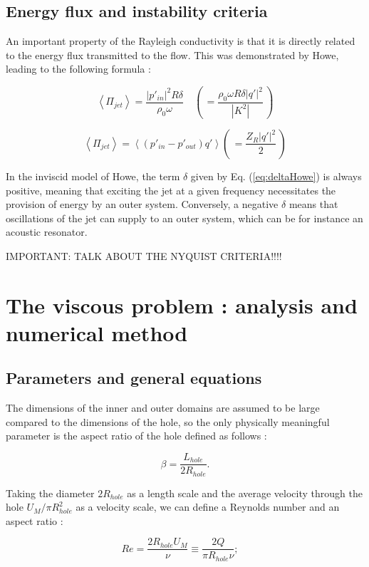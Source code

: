 \documentclass{jfm}
\newcommand\be{\begin{equation}}
\newcommand\ee{\end{equation}}
\begin{document}
\subsection{Energy flux and instability criteria}


An important property of the Rayleigh conductivity is that it is directly related to the energy flux transmitted to the flow. This was demonstrated by Howe, leading to the following formula :

\be
\left< \Pi_{jet} \right>  = \frac{ |p'_{in}|^2 R \delta}{\rho_0 \omega} 
\quad 
\left( \, = \frac{\rho_0 \omega R \delta | q' |^2 }{|K^2|} \, \right) 
\label{eq:Pienergy}
\ee

\be
\left< \Pi_{jet} \right>  = \left< (p'_{in}-p'_{out}) q'  \right> 
\left( \, = \frac{Z_R | q' |^2 }{2} \, \right) 
\label{eq:Pienergy}
\ee

In the inviscid model of Howe, the term $\delta$ given by Eq. (\ref{eq:deltaHowe}) is always positive, meaning that 
exciting the jet at a given frequency necessitates the provision of energy by an outer system. 
Conversely, a negative $\delta$ means that oscillations of the jet can supply to an outer system, which can be for instance an acoustic resonator. 

IMPORTANT: TALK ABOUT THE NYQUIST CRITERIA!!!!



\section{The viscous problem : analysis and numerical method}


\subsection{Parameters and general equations}



The dimensions of the inner and outer domains are assumed to be large compared to the dimensions of the hole, so the only physically meaningful parameter is the aspect ratio of the hole defined as follows : 

$$
\beta = \frac{ L_{hole}}{2 R_{hole}}.
$$

Taking the diameter $2 R_{hole} $ as a length scale and the average velocity through the hole  $U_M/\pi R_{hole}^2$  as a velocity scale, we can define a Reynolds number and an aspect ratio :

$$ 
Re = \frac{ 2 R_{hole} U_M}{\nu} \equiv \frac{2 Q }{ \pi R_{hole} \nu} ; \quad
$$ 
\end{document}
